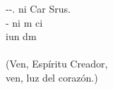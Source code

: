 \begin{cancion}%
	--. ni Car Srus.\\
	 - ni m ci\\
	iun dm\\
	\jump\\
(Ven, Espíritu Creador,\\
 ven, luz del corazón.)\\
\end{cancion}%
